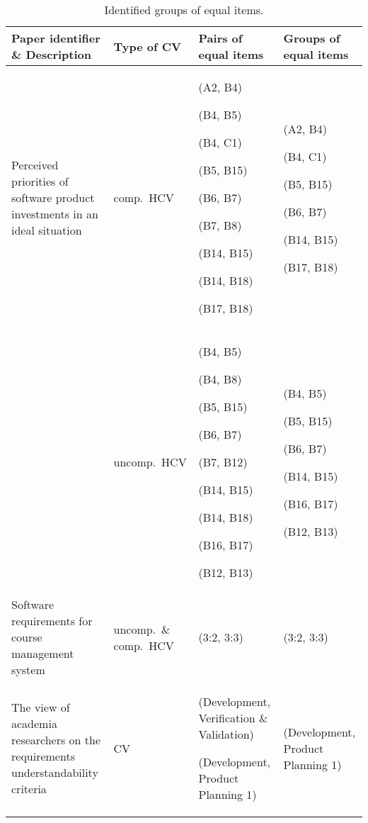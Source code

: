 \begin{table*}
	\center
\scriptsize
\caption{\label{tab:ECVresult}Identified groups of equal items.}

\begin{tabular}{|>{\centering}p{}|>{\centering}p{}|>{\centering}p{}|>{\centering}p{}|}
\hline 
Paper identifier \& Description  & Type of CV  & Pairs of equal items  & Groups of equal items\tabularnewline
\hline 
\cite{Barney2009} Perceived priorities of software product investments
in an ideal situation  & comp.\ HCV & (A2, B4)

(B4, B5)

(B4, C1)

(B5, B15)

(B6, B7)

(B7, B8)

(B14, B15)

(B14, B18)

(B17, B18) & (A2, B4)

(B4, C1)

(B5, B15)

(B6, B7)

(B14, B15)

(B17, B18)\tabularnewline
\cline{2-4}
 & uncomp.\ HCV & (B4, B5)

(B4, B8)

(B5, B15)

(B6, B7)

(B7, B12)

(B14, B15)

(B14, B18)

(B16, B17)

(B12, B13) & (B4, B5)

(B5, B15)

(B6, B7)

(B14, B15)

(B16, B17)

(B12, B13)\tabularnewline
\hline 
\cite{Berander2009a} Software requirements for course management system  & uncomp.\ \& comp.\ HCV  & (3:2, 3:3) & (3:2, 3:3)\tabularnewline
\hline 
\cite{Svahnberg2008} The view of academia researchers
on the requirements understandability criteria  & CV & (Development, Verification \& Validation)

(Development, Product Planning 1) & (Development, Product Planning 1)\tabularnewline
\hline
\end{tabular}%
\end{table*}


